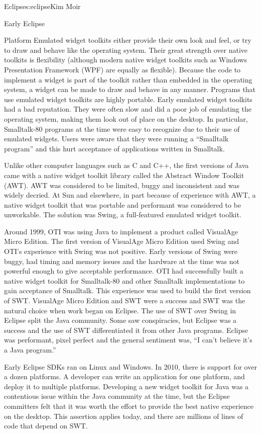 \begin{aosachapter}{Eclipse}{s:eclipse}{Kim Moir}
\begin{aosasect1}{Early Eclipse}
\begin{aosasect2}{Platform}
Emulated widget toolkits either provide their own look and feel, or
try to draw and behave like the operating system. Their great strength
over native toolkits is flexibility (although modern native widget
toolkits such as Windows Presentation Framework (WPF) are equally as
flexible). Because the code to implement a widget is part of the
toolkit rather than embedded in the operating system, a widget can be
made to draw and behave in any manner. Programs that use emulated
widget toolkits are highly portable.  Early emulated widget toolkits
had a bad reputation. They were often slow and did a poor job of
emulating the operating system, making them look out of place on the
desktop.  In particular, Smalltalk-80 programs at the time were easy
to recognize due to their use of emulated widgets. Users were aware
that they were running a ``Smalltalk program'' and this hurt
acceptance of applications written in Smalltalk.

Unlike other computer languages such as C and C++, the first versions
of Java came with a native widget toolkit library called the Abstract
Window Toolkit (AWT). AWT was considered to be limited, buggy and
inconsistent and was widely decried. At Sun and elsewhere, in part
because of experience with AWT, a native widget toolkit that was
portable and performant was considered to be unworkable. The solution
was Swing, a full-featured emulated widget toolkit.

Around 1999, OTI was using Java to implement a product called
VisualAge Micro Edition. The first version of VisualAge Micro Edition
used Swing and OTI's experience with Swing was not positive. Early
versions of Swing were buggy, had timing and memory issues and the
hardware at the time was not powerful enough to give acceptable
performance. OTI had successfully built a native widget toolkit for
Smalltalk-80 and other Smalltalk implementations to gain acceptance of
Smalltalk.  This experience was used to build the first version of
SWT\@. VisualAge Micro Edition and SWT were a success and SWT was the
natural choice when work began on Eclipse.  The use of SWT over Swing
in Eclipse split the Java community. Some saw conspiracies, but
Eclipse was a success and the use of SWT differentiated it from other
Java programs.  Eclipse was performant, pixel perfect and the general
sentiment was, ``I can't believe it's a Java program.''

Early Eclipse SDKs ran on Linux and Windows. In 2010, there is support
for over a dozen platforms. A developer can write an application for
one platform, and deploy it to multiple platforms. Developing a new
widget toolkit for Java was a contentious issue within the Java
community at the time, but the Eclipse committers felt that it was
worth the effort to provide the best native experience on the
desktop. This assertion applies today, and there are millions of lines
of code that depend on SWT.


\end{aosasect2}
\end{aosasect1}
\end{aosachapter}
